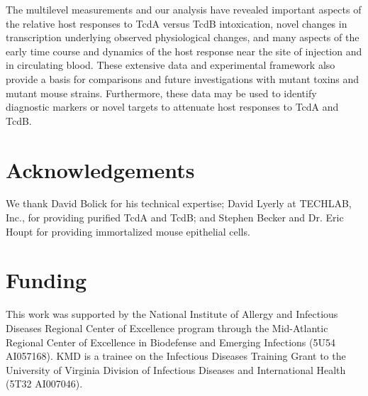 The multilevel measurements and our analysis have revealed important aspects of the relative host responses to TcdA versus TcdB intoxication, novel changes in transcription underlying observed physiological changes, and many aspects of the early time course and dynamics of the host response near the site of injection and in circulating blood. These extensive data and experimental framework also provide a basis for comparisons and future investigations with mutant toxins and mutant mouse strains. Furthermore, these data may be used to identify diagnostic markers or novel targets to attenuate host responses to TcdA and TcdB. 

\section{Acknowledgements}
We thank David Bolick for his technical expertise; David Lyerly at TECHLAB, Inc., for providing purified TcdA and TcdB; and Stephen Becker and Dr. Eric Houpt for providing immortalized mouse epithelial cells.

\section{Funding}
This work was supported by the National Institute of Allergy and Infectious Diseases Regional Center of Excellence program through the Mid-Atlantic Regional Center of Excellence in Biodefense and Emerging Infections (5U54 AI057168). KMD is a trainee on the Infectious Diseases Training Grant to the University of Virginia Division of Infectious Diseases and International Health (5T32 AI007046).








\singlespacing
\printbibliography



